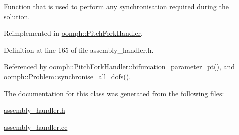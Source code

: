 Function that is used to perform any synchronisation required during the solution. 



Reimplemented in \hyperlink{classoomph_1_1PitchForkHandler_a23a67d7212e25108e40cf9b4606f4478}{oomph\+::\+Pitch\+Fork\+Handler}.



Definition at line 165 of file assembly\+\_\+handler.\+h.



Referenced by oomph\+::\+Pitch\+Fork\+Handler\+::bifurcation\+\_\+parameter\+\_\+pt(), and oomph\+::\+Problem\+::synchronise\+\_\+all\+\_\+dofs().



The documentation for this class was generated from the following files\+:\begin{DoxyCompactItemize}
\item 
\hyperlink{assembly__handler_8h}{assembly\+\_\+handler.\+h}\item 
\hyperlink{assembly__handler_8cc}{assembly\+\_\+handler.\+cc}\end{DoxyCompactItemize}
